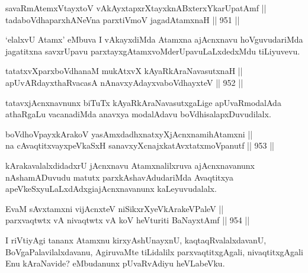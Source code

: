 \begin{shl}
savaRmAtemxVtayxtoV vAkAyxtapxrXtayxknABxterxYkarUpatAmf ||  \\
tadaboVdhaparxhANeVna parxtiVmoV jagadAtamxnaH \hfill || 951 ||  
\end{shl}

\begin{artha}
`elalxvU Atamx' eMbuva I vAkayxdiMda Atamxna ajAcnxnavu hoVguvudariMda jagatitxna savxrUpavu parxtayxgAtamxvoMderUpavuLaLxdedxMdu tiLiyuvevu.
\end{artha}

\begin{shl}
tatatxvXparxboVdhanaM mukAtxvX kAyaRkAraNavasutxnaH || \\
apUvARdayxthaRvacasA nAnavxyAdayxvaboVdhayxteV \hfill || 952 ||  
\end{shl}

\begin{artha}
tatavxjAcnxnavnunx biTuTx kAyaRkAraNavasutxgaLige apUvaRmoda\-\break lAda athaRgaLu vacanadiMda anavxya modalAdavu boVdhisalapxDuvudilalx.
\end{artha}


\begin{shl}
boVdhoV\s payxkArakoV yasAmxdadhxnatxyXjAcnxnamihA\s \s tamxni || \\
na cA\s \s vaqtitxvayxpeVkaSxH sanavxyXcnajxkatAvxtatxmoVpanutf \hfill || 953 ||  
\end{shl}

\begin{artha}
kArakavalalxdidadxrU jAcnxnavu Atamxnalilxruva ajAcnxnavanunx nAshamADuvudu matutx parxkAshavAdudariMda Avaqtitxya apeVkeSxyuLaLxdAdxgi\break ajAcnxnavanunx kaLeyuvudalalx.
\end{artha}


\begin{shl}
EvaM sAvxtamxni vijAcnxteV niSikxrXyeV\s kArakeV\s PaleV || \\
parxvaqtwtx vA nivaqtwtx vA koV heVturiti BaNayxtAmf \hfill || 954 ||  
\end{shl}

\begin{artha}
I riVtiyAgi tananx Atamxnu kirxyAshUnayxnU, kaqtaqRvalalxdavanU, BoVgaPalavilalxdavanu, AgiruvaMte tiLidalilx parxvaqtitxgAgali, nivaqtitxgAgali Enu kAraNavide? eMbudanunx pUvaRvAdiyu heVLabeVku.
\end{artha}

